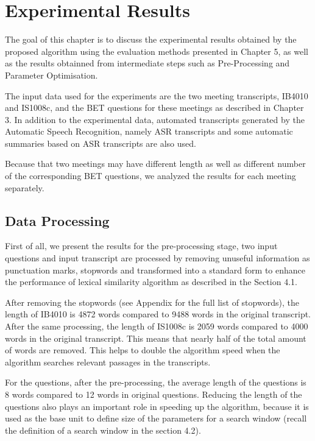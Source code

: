 \chapter{Experimental Results}
The goal of this chapter is to discuss the experimental results obtained by the proposed algorithm using the evaluation methods  presented in  Chapter 5, as well as the results obtainned from intermediate steps such as Pre-Processing and Parameter Optimisation. 

The input data used for the experiments are the two meeting transcripts, IB4010 and IS1008c, and the BET questions for these meetings as described in Chapter 3. In addition to the experimental data, automated transcripts generated by the Automatic Speech Recognition, namely ASR transcripts and some automatic summaries based on ASR transcripts are also used. 

Because that two meetings may have different length as well as different number of the corresponding BET questions, we analyzed the results for each meeting separately.

\section{Data Processing}


First of all, we present the results for the pre-processing stage, two input questions and input transcript are processed by removing unuseful information as punctuation marks, stopwords and transformed into a standard form to enhance the performance of lexical similarity algorithm as described in the Section 4.1.

After removing the stopwords (see Appendix for the full list of stopwords), the length of IB4010 is 4872 words compared to 9488 words in the original transcript. After the same processing, the length of IS1008c is 2059 words compared to 4000 words in the original transcript. This means that nearly half of the total amount of words are removed. This helps to double the algorithm speed when the algorithm searches relevant passages in the transcripts.

For the questions, after the pre-processing, the average length of the questions is 8 words compared to 12 words in original questions. Reducing the length of the questions also plays an important role in speeding up the algorithm, because it is used as the base unit to define size of the parameters for a search window (recall the definition of a search window in the section 4.2).

